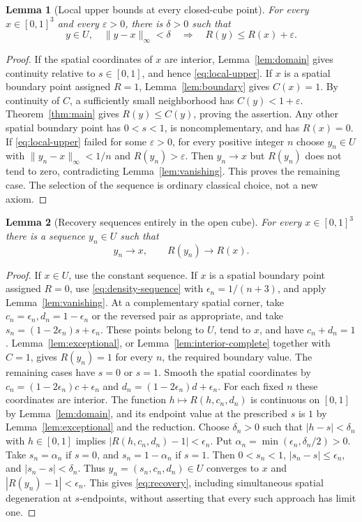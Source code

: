 \documentclass[11pt,a4paper]{article}
\newtheorem{lemma}{Lemma}[section]
\theoremstyle{definition}
\newcommand{\E}[2]{\refstepcounter{equation}\[#2\tag{\theequation}\label{eq:#1}\]}
\begin{document}
\begin{lemma}[Local upper bounds at every closed-cube point]\label{lem:local-upper}
For every $x\in[0,1]^3$ and every $\varepsilon>0$, there is $\delta>0$ such that
\E{local-upper}{y\in U,\quad \|y-x\|_\infty<\delta
 \quad\Longrightarrow\quad R(y)\leq R(x)+\varepsilon.}
\end{lemma}
\begin{proof}
If the spatial coordinates of $x$ are interior, Lemma~\ref{lem:domain} gives continuity relative to $s\in[0,1]$, and hence \eqref{eq:local-upper}.
If $x$ is a spatial boundary point assigned $R=1$, Lemma~\ref{lem:boundary} gives $C(x)=1$. By continuity of $C$, a sufficiently small neighborhood has $C(y)<1+\varepsilon$. Theorem~\ref{thm:main} gives $R(y)\leq C(y)$, proving the assertion.
Any other spatial boundary point has $0<s<1$, is noncomplementary, and has $R(x)=0$. If \eqref{eq:local-upper} failed for some $\varepsilon>0$, for every positive integer $n$ choose $y_n\in U$ with $\|y_n-x\|_\infty<1/n$ and $R(y_n)>\varepsilon$. Then $y_n\to x$ but $R(y_n)$ does not tend to zero, contradicting Lemma~\ref{lem:vanishing}. This proves the remaining case. The selection of the sequence is ordinary classical choice, not a new axiom.
\end{proof}

\begin{lemma}[Recovery sequences entirely in the open cube]\label{lem:recovery}
For every $x\in[0,1]^3$ there is a sequence $y_n\in U$ such that
\E{recovery}{y_n\longrightarrow x,\qquad R(y_n)\longrightarrow R(x).}
\end{lemma}
\begin{proof}
If $x\in U$, use the constant sequence. If $x$ is a spatial boundary point assigned $R=0$, use \eqref{eq:density-sequence} with $\epsilon_n=1/(n+3)$, and apply Lemma~\ref{lem:vanishing}.
At a complementary spatial corner, take $c_n=\epsilon_n,d_n=1-\epsilon_n$ or the reversed pair as appropriate, and take $s_n=(1-2\epsilon_n)s+\epsilon_n$. These points belong to $U$, tend to $x$, and have $c_n+d_n=1$. Lemma~\ref{lem:exceptional}, or Lemma~\ref{lem:interior-complete} together with $C=1$, gives $R(y_n)=1$ for every $n$, the required boundary value.
The remaining cases have $s=0$ or $s=1$. Smooth the spatial coordinates by
$c_n=(1-2\epsilon_n)c+\epsilon_n$ and $d_n=(1-2\epsilon_n)d+\epsilon_n$.
For each fixed $n$ these coordinates are interior. The function $h\mapsto R(h,c_n,d_n)$ is continuous on $[0,1]$ by Lemma~\ref{lem:domain}, and its endpoint value at the prescribed $s$ is $1$ by Lemma~\ref{lem:exceptional} and the reduction.
Choose $\delta_n>0$ such that $|h-s|<\delta_n$ with $h\in[0,1]$ implies $|R(h,c_n,d_n)-1|<\epsilon_n$. Put $\alpha_n=\min(\epsilon_n,\delta_n/2)>0$. Take $s_n=\alpha_n$ if $s=0$, and $s_n=1-\alpha_n$ if $s=1$.
Then $0<s_n<1$, $|s_n-s|\leq\epsilon_n$, and $|s_n-s|<\delta_n$. Thus $y_n=(s_n,c_n,d_n)\in U$ converges to $x$ and $|R(y_n)-1|<\epsilon_n$. This gives \eqref{eq:recovery}, including simultaneous spatial degeneration at $s$-endpoints, without asserting that every such approach has limit one.
\end{proof}
\end{document}

